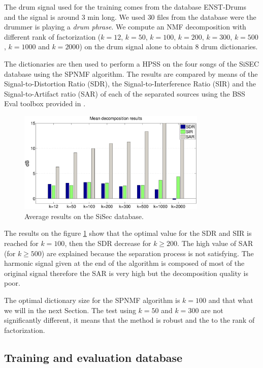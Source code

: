 \documentclass{article}
\begin{document}
The drum signal used for the training comes from the database ENST-Drums \cite{gillet2006enst} and the signal is around $3$ min long. We used $30$ files from the database were the drummer is playing a \emph{drum phrase}. We compute an NMF decomposition with different rank of factorization ($k=12$, $k=50$, $k=100$, $k=200$, $k=300$, $k=500$, $k=1000$ and $k=2000$) on the drum signal alone to obtain $8$ drum dictionaries.

The dictionaries are then used to perform a HPSS on the four songs of the SiSEC database using the SPNMF algorithm. The results are compared by means of the Signal-to-Distortion Ratio (SDR), the Signal-to-Interference Ratio (SIR) and the Signal-to-Artifact ratio (SAR) of each of the separated sources using the BSS Eval toolbox provided in \cite{bsseval}.

\begin{figure}[h]

  \centering 
  \includegraphics[width=9cm]{figs/AllDictSizeISMIR.eps}
  \caption{\label{dictsize} Average results on the SiSec database.}
  
\end{figure}

The results on the figure \ref{dictsize} show that the optimal value for the SDR and SIR is reached for $k=100$, then the SDR decrease for $k\geqslant 200$. The high value of SAR (for $k\geqslant 500$) are explained because the separation process is not satisfying. The harmonic signal given at the end of the algorithm is composed of most of the original signal therefore the SAR is very high but the decomposition quality is poor. 

The optimal dictionary size for the SPNMF algorithm is $k=100$ and that what we will in the next Section. The test using $k=50$ and $k=300$ are not significantly different, it means that the method is robust and the to the rank of factorization. 

\subsection{Training and evaluation database}\label{database}
\end{document}
